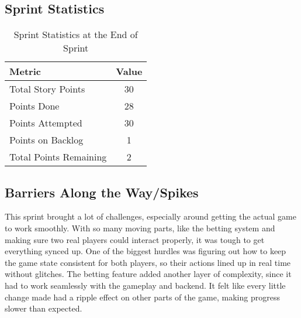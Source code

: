 \subsection{Sprint Statistics}
\begin{table}[H]
    \centering
    \begin{tabular}{|l|c|}
    \hline
    \textbf{Metric} & \textbf{Value} \\ \hline
    Total Story Points & 30 \\ \hline
    Points Done & 28 \\ \hline
    Points Attempted & 30 \\ \hline
    Points on Backlog & 1 \\ \hline
    Total Points Remaining & 2 \\ \hline
    \end{tabular}
    \caption{Sprint Statistics at the End of Sprint}
    \label{tab:sprint_statistics}
\end{table}

\subsection{Barriers Along the Way/Spikes}

\setlength{\parskip}{1em}
This sprint brought a lot of challenges, especially around getting the actual game to work smoothly. With so many moving parts, like the betting system and making sure two real players could interact properly, it was tough to get everything synced up. One of the biggest hurdles was figuring out how to keep the game state consistent for both players, so their actions lined up in real time without glitches. The betting feature added another layer of complexity, since it had to work seamlessly with the gameplay and backend. It felt like every little change made had a ripple effect on other parts of the game, making progress slower than expected.

\clearpage
